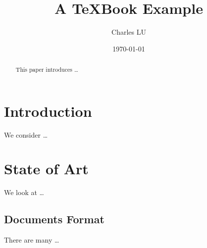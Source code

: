 \documentclass[a4paper,11pt]{book}
\author{Charles LU}
\title{A \TeX Book Example}
\date{\today}
\begin{document}
\maketitle
\tableofcontents

\begin{abstract}
This paper introduces \ldots
\end{abstract}

\section{Introduction}
We consider \ldots

\section{State of Art}
We look at \ldots

\subsection{Documents Format}
There are many \dots
\end{document}
